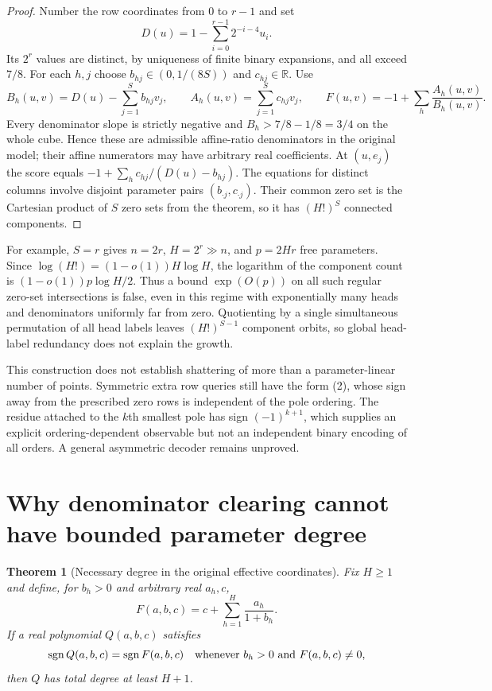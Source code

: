 \documentclass[11pt]{article}
\newtheorem{theorem}{Theorem}
\begin{document}
\begin{proof}
Number the row coordinates from $0$ to $r-1$ and set
\[
 D(u)=1-\sum_{i=0}^{r-1}2^{-i-4}u_i.
\]
Its $2^r$ values are distinct, by uniqueness of finite binary
expansions, and all exceed $7/8$. For each $h,j$ choose
$b_{hj}\in(0,1/(8S))$ and $c_{hj}\in\mathbb R$. Use
\[
 B_h(u,v)=D(u)-\sum_{j=1}^S b_{hj}v_j,
 \qquad A_h(u,v)=\sum_{j=1}^S c_{hj}v_j,
 \qquad F(u,v)=-1+\sum_h\frac{A_h(u,v)}{B_h(u,v)}.
\]
Every denominator slope is strictly negative and
$B_h>7/8-1/8=3/4$ on the whole cube. Hence these are admissible
affine-ratio denominators in the original model; their affine
numerators may have arbitrary real coefficients.
At $(u,e_j)$ the score equals
$-1+\sum_h c_{hj}/(D(u)-b_{hj})$. The equations for distinct
columns involve disjoint parameter pairs $(b_{\cdot j},c_{\cdot j})$.
Their common zero set is the Cartesian product of $S$ zero sets
from the theorem, so it has $(H!)^S$ connected components.
\end{proof}

For example, $S=r$ gives $n=2r$, $H=2^r\gg n$, and $p=2Hr$
free parameters. Since $\log(H!)=(1-o(1))H\log H$, the logarithm
of the component count is $(1-o(1))p\log H/2$. Thus a bound
$\exp(O(p))$ on all such regular zero-set intersections is false,
even in this regime with exponentially many heads and denominators
uniformly far from zero. Quotienting by a single simultaneous
permutation of all head labels leaves $(H!)^{S-1}$ component orbits,
so global head-label redundancy does not explain the growth.

This construction does not establish shattering of more than a
parameter-linear number of points. Symmetric extra row queries still
have the form (2), whose sign away from the prescribed zero rows is
independent of the pole ordering. The residue attached to the
$k$th smallest pole has sign $(-1)^{k+1}$, which supplies an
explicit ordering-dependent observable but not an independent
binary encoding of all orders. A general asymmetric decoder remains
unproved.

\section{Why denominator clearing cannot have bounded parameter degree}

\begin{theorem}[Necessary degree in the original effective coordinates]
Fix $H\geq 1$ and define, for $b_h>0$ and arbitrary real $a_h,c$,
\[
 F(a,b,c)=c+\sum_{h=1}^H\frac{a_h}{1+b_h}.
\]
If a real polynomial $Q(a,b,c)$ satisfies
\[
 \operatorname{sgn} Q(a,b,c)=\operatorname{sgn} F(a,b,c)
 \quad\hbox{whenever }b_h>0\hbox{ and }F(a,b,c)\ne0,
\]
then $Q$ has total degree at least $H+1$.
\end{theorem}
\end{document}
